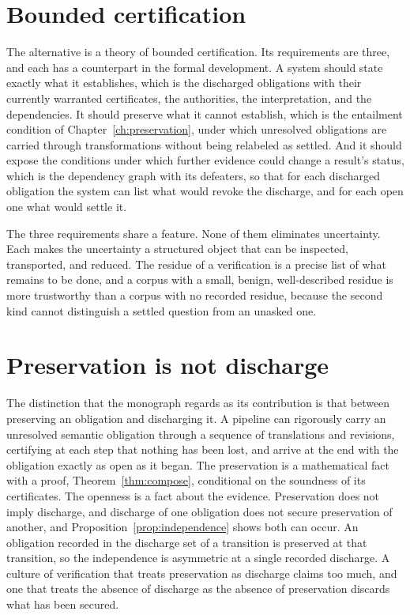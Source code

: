 \section{Bounded certification}

The alternative is a theory of bounded certification. Its requirements are three, and each has a counterpart in the formal development. A system should state exactly what it establishes, which is the discharged obligations with their currently warranted certificates, the authorities, the interpretation, and the dependencies. It should preserve what it cannot establish, which is the entailment condition of Chapter~\ref{ch:preservation}, under which unresolved obligations are carried through transformations without being relabeled as settled. And it should expose the conditions under which further evidence could change a result's status, which is the dependency graph with its defeaters, so that for each discharged obligation the system can list what would revoke the discharge, and for each open one what would settle it.

The three requirements share a feature. None of them eliminates uncertainty. Each makes the uncertainty a structured object that can be inspected, transported, and reduced. The residue of a verification is a precise list of what remains to be done, and a corpus with a small, benign, well-described residue is more trustworthy than a corpus with no recorded residue, because the second kind cannot distinguish a settled question from an unasked one.

\section{Preservation is not discharge}

The distinction that the monograph regards as its contribution is that between preserving an obligation and discharging it. A pipeline can rigorously carry an unresolved semantic obligation through a sequence of translations and revisions, certifying at each step that nothing has been lost, and arrive at the end with the obligation exactly as open as it began. The preservation is a mathematical fact with a proof, Theorem~\ref{thm:compose}, conditional on the soundness of its certificates. The openness is a fact about the evidence. Preservation does not imply discharge, and discharge of one obligation does not secure preservation of another, and Proposition~\ref{prop:independence} shows both can occur. An obligation recorded in the discharge set of a transition is preserved at that transition, so the independence is asymmetric at a single recorded discharge. A culture of verification that treats preservation as discharge claims too much, and one that treats the absence of discharge as the absence of preservation discards what has been secured.

